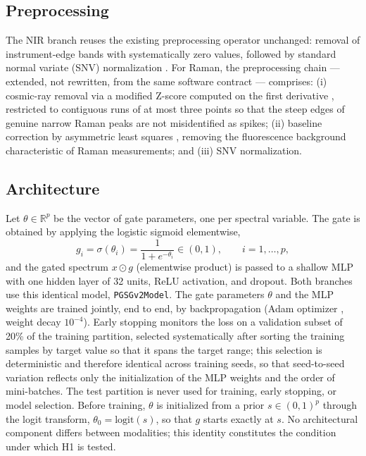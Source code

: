 \documentclass[preprint,12pt]{elsarticle}
\begin{document}
\subsection{Preprocessing}

The NIR branch reuses the existing preprocessing operator unchanged: removal of instrument-edge bands with systematically zero values, followed by standard normal variate (SNV) normalization \cite{barnes1989snv}. For Raman, the preprocessing chain --- extended, not rewritten, from the same software contract --- comprises: (i) cosmic-ray removal via a modified Z-score computed on the first derivative \cite{whitaker2018}, restricted to contiguous runs of at most three points so that the steep edges of genuine narrow Raman peaks are not misidentified as spikes; (ii) baseline correction by asymmetric least squares \cite{eilers2005}, removing the fluorescence background characteristic of Raman measurements; and (iii) SNV normalization.

\subsection{Architecture}
\label{sec:architecture}

Let $\theta\in\mathbb{R}^{p}$ be the vector of gate parameters, one per spectral variable. The gate is obtained by applying the logistic sigmoid elementwise,
\begin{equation}
g_i=\sigma(\theta_i)=\frac{1}{1+e^{-\theta_i}}\in(0,1), \qquad i=1,\dots,p,
\label{eq:gate}
\end{equation}
and the gated spectrum $x\odot g$ (elementwise product) is passed to a shallow MLP with one hidden layer of 32 units, ReLU activation, and dropout. Both branches use this identical model, \texttt{PGSGv2Model}. The gate parameters $\theta$ and the MLP weights are trained jointly, end to end, by backpropagation (Adam optimizer \cite{kingma2015adam}, weight decay $10^{-4}$). Early stopping monitors the loss on a validation subset of 20\% of the training partition, selected systematically after sorting the training samples by target value so that it spans the target range; this selection is deterministic and therefore identical across training seeds, so that seed-to-seed variation reflects only the initialization of the MLP weights and the order of mini-batches. The test partition is never used for training, early stopping, or model selection. Before training, $\theta$ is initialized from a prior $s\in(0,1)^{p}$ through the logit transform, $\theta_0=\mathrm{logit}(s)$, so that $g$ starts exactly at $s$. No architectural component differs between modalities; this identity constitutes the condition under which H1 is tested.
\end{document}
